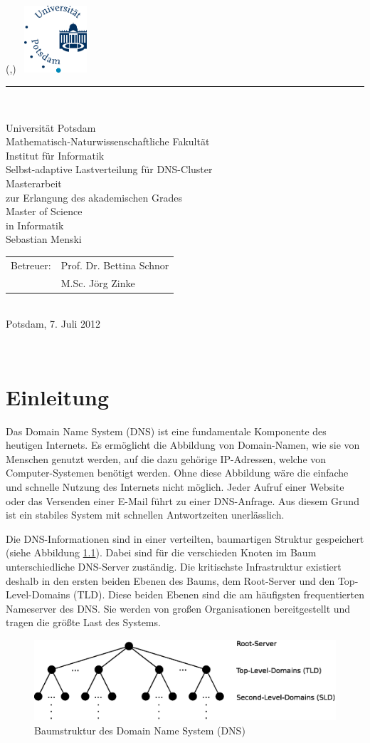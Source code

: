 \documentclass[a4paper, 12pt, BCOR10mm, DIV12, toc=bibliography, toc=listof, german]{scrbook}
\newlength{\TitleMargin}
\newlength{\TitleWidth}
\newcommand{\TitleUni}{Universität Potsdam}
\newcommand{\TitleInstitut}{Mathematisch-Naturwissenschaftliche Fakultät\\Institut für Informatik}
\newcommand{\TitleTitel}{Selbst-adaptive Lastverteilung für DNS-Cluster}
\newcommand{\TitleTyp}{Masterarbeit}
\newcommand{\TitleAutor}{Sebastian Menski}
\newcommand{\TitleBetreuerText}{Betreuer}
\newcommand{\TitleBetreuer}{Prof. Dr. Bettina Schnor\\ &M.Sc. Jörg Zinke}
\newcommand{\TitleAbschlussText}{zur Erlangung des akademischen Grades\\Master of Science\\in Informatik}
\newcommand{\TitleOrt}{Potsdam}
\newcommand{\TitleDatum}{7. Juli 2012}
\renewcommand{\maketitle}{
	\thispagestyle{empty}
	\begin{textblock*}{\TitleWidth}(\TitleMargin,\TitleMargin)
		~\hfill\includegraphics[height=2.5cm]{images/uni-logo}\\[3mm]
		{\color{uniblue}\rule{\TitleWidth}{1mm}}\\[5mm]
		{
			\centering
			\sffamily\Large
			{\LARGE\TitleUni}\\[0.5\baselineskip]
			{\large\TitleInstitut}\\[5\baselineskip]
			{\Huge\TitleTitel}\\[3\baselineskip]

			{\TitleTyp}\\
			\TitleAbschlussText\\[3\baselineskip]

			\TitleAutor\\[3\baselineskip]
			\begin{tabular}{rl}
				\TitleBetreuerText: & \TitleBetreuer
			\end{tabular}\\[2\baselineskip]
			\TitleOrt, \TitleDatum\par
		}
	\end{textblock*}
	~\clearpage
}
\def \dns {Domain Name System (DNS)}
\begin{document}
	\frontmatter
	\maketitle{}
	\tableofcontents{}

	\onehalfspacing{}
	\mainmatter
	\pagestyle{scrheadings}

	\chapter{Einleitung} %
	\label{cha:einleitung}

		Das \dns{} \cite{rfc1034, rfc1035} ist eine fundamentale Komponente des heutigen Internets. Es
		ermöglicht die Abbildung von Domain-Namen, wie sie von Menschen genutzt werden, auf die dazu
		gehörige IP-Adressen, welche von Computer-Systemen benötigt werden. Ohne diese Abbildung wäre
		die einfache und schnelle Nutzung des Internets nicht möglich. Jeder Aufruf einer Website oder
		das Versenden einer E-Mail führt zu einer DNS-Anfrage. Aus diesem Grund ist ein stabiles System
		mit schnellen Antwortzeiten unerlässlich.
		
		Die DNS-Informationen sind in einer verteilten, baumartigen Struktur gespeichert (siehe
		Abbildung \ref{fig:tree}).  Dabei sind für die verschieden Knoten im Baum unterschiedliche
		DNS-Server zuständig. Die kritischste Infrastruktur existiert deshalb in den ersten beiden
		Ebenen des Baums, dem Root-Server und den Top-Level-Domains (TLD). Diese beiden Ebenen sind die
		am häufigsten frequentierten Nameserver des DNS. Sie werden von großen Organisationen
		bereitgestellt und tragen die größte Last des Systems.

		\begin{figure}
			\centering
			\includegraphics[width=\textwidth]{images/tree}
			\caption{Baumstruktur des \dns{}}
			\label{fig:tree}
		\end{figure}
		
\end{document}
